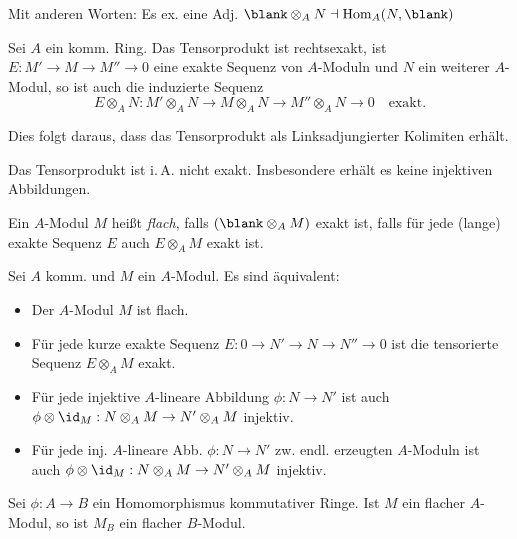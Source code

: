 \documentclass{cheat-sheet}
\DeclareMathOperator{\Hom}{Hom} %
\newcommand{\ladj}{\dashv} %
\begin{document}
\begin{bem}
  Mit anderen Worten: Es ex. eine Adj. \enspace $\blank \otimes_A N \ladj \Hom_A(N, \blank)$
\end{bem}


\begin{prop}
  Sei $A$ ein komm. Ring.
  Das Tensorprodukt ist rechtsexakt, \dh{} ist $E : M' \to M \to M'' \to 0$ eine exakte Sequenz von $A$-Moduln und $N$ ein weiterer $A$-Modul, so ist auch die induzierte Sequenz
  \[
    E \otimes_A N : M' \otimes_A N \to M \otimes_A N \to M'' \otimes_A N \to 0
    \quad \text{exakt.}
  \]
\end{prop}

\begin{bem}
  Dies folgt daraus, dass das Tensorprodukt als Linksadjungierter Kolimiten erhält.
\end{bem}

\begin{acht}
  Das Tensorprodukt ist i.\,A. nicht exakt.
  Insbesondere erhält es keine injektiven Abbildungen.
\end{acht}


\begin{defn}
  Ein $A$-Modul $M$ heißt \emph{flach}, falls $(\blank \otimes_A M)$ exakt ist, \dh{} falls für jede (lange) exakte Sequenz $E$ auch $E \otimes_A M$ exakt ist.
\end{defn}

\begin{prop}
  Sei $A$ komm. und $M$ ein $A$-Modul.
  Es sind äquivalent:
  \begin{itemize}
    \item Der $A$-Modul $M$ ist flach.
    \item Für jede kurze exakte Sequenz $E : 0 \to N' \to N \to N'' \to 0$ ist die tensorierte Sequenz $E \otimes_A M$ exakt.
    \item Für jede injektive $A$-lineare Abbildung $\phi : N \to N'$ ist auch $\phi \otimes \id_M : N \otimes_A M \to N' \otimes_A M$ injektiv.
    \item Für jede inj. $A$-lineare Abb. $\phi : N \to N'$ zw. endl. erzeugten $A$-Moduln ist auch $\phi \otimes \id_M : N \otimes_A M \to N' \otimes_A M$ injektiv.
  \end{itemize}
\end{prop}

\begin{prop}
  Sei $\phi : A \to B$ ein Homomorphismus kommutativer Ringe.
  Ist $M$ ein flacher $A$-Modul, so ist $M_B$ ein flacher $B$-Modul.
\end{prop}
\end{document}
